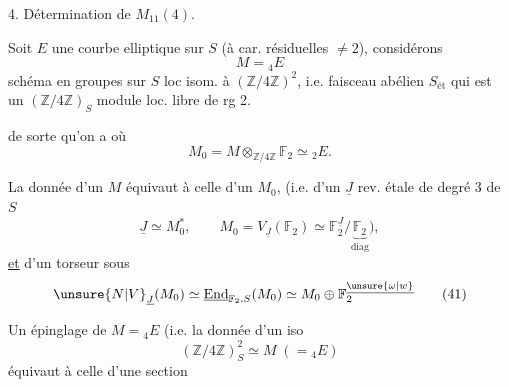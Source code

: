4. Détermination de $M_{11}(4)$.

Soit $E$ une courbe elliptique sur $S$ (à car. résiduelles $\ne 2$), considérons
\[
M={}_4E \tag*{(38)}
\]
schéma en groupes sur $S$ loc isom. à $(\mathbb Z/4\mathbb Z)^2$, i.e.  faisceau abélien   $S_{\text{ét}}$ qui est un $(\mathbb Z/4\mathbb Z)_S$ module loc. libre de rg 2.

 de sorte qu'on a
où
\[
M_0=M\otimes_{\mathbb Z/4\mathbb Z}\mathbb F_2\simeq {}_2E .
\]

La donnée d'un $M$ équivaut à celle d'un $M_0$, (i.e. d'un $\underline{J}$ rev. étale de degré 3 de $S$ 
\[
\underline J\simeq M_0^\ast,\qquad
M_0=V_{\underline J}(\mathbb F_2)\simeq
\mathbb F_2^{\underline J}/\underbrace{\mathbb F_2}_{\mathrm{diag}}\big), \tag*{(40)}
\]
\uline{et} d'un torseur  sous
\[
\unsure{N|V}_{\underline J}(M_0)\simeq\underline{\mathrm{End}}_{\mathbb F_2,S}(M_0)
\simeq M_0\oplus\mathbb F_2^{\underline{\unsure{\omega|w}}} \tag*{(41)}
\]

Un épinglage de $M={}_4E$ (i.e.  la donnée d'un iso
\[
(\mathbb Z/4\mathbb Z)^2_S\simeq M\;(={}_4E) \tag*{(42)}
\]
équivaut à celle d'une  section 

